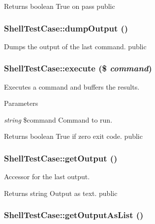 \begin{DoxyReturn}{Returns}
boolean True on pass  public 
\end{DoxyReturn}
\hypertarget{class_shell_test_case_ac2d50f283cda194f94336bbcfd5e9007}{
\subsubsection[{dumpOutput}]{\setlength{\rightskip}{0pt plus 5cm}ShellTestCase::dumpOutput ()}}
\label{class_shell_test_case_ac2d50f283cda194f94336bbcfd5e9007}
Dumps the output of the last command.  public \hypertarget{class_shell_test_case_a5ec49777fe58eba848d0d2db0f7ac98a}{
\subsubsection[{execute}]{\setlength{\rightskip}{0pt plus 5cm}ShellTestCase::execute (\$ {\em command})}}
\label{class_shell_test_case_a5ec49777fe58eba848d0d2db0f7ac98a}
Executes a command and buffers the results. 
\begin{DoxyParams}{Parameters}
\item[{\em string}]\$command Command to run. \end{DoxyParams}
\begin{DoxyReturn}{Returns}
boolean True if zero exit code.  public 
\end{DoxyReturn}
\hypertarget{class_shell_test_case_a92137846850cac08f6840b6def2d8f22}{
\subsubsection[{getOutput}]{\setlength{\rightskip}{0pt plus 5cm}ShellTestCase::getOutput ()}}
\label{class_shell_test_case_a92137846850cac08f6840b6def2d8f22}
Accessor for the last output. \begin{DoxyReturn}{Returns}
string Output as text.  public 
\end{DoxyReturn}
\hypertarget{class_shell_test_case_a53847d86f26b9ffc12f030041628bcd9}{
\subsubsection[{getOutputAsList}]{\setlength{\rightskip}{0pt plus 5cm}ShellTestCase::getOutputAsList ()}}
